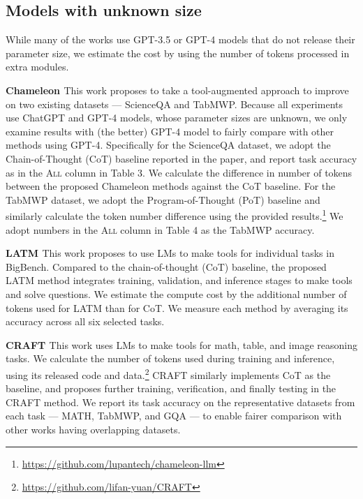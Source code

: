 \subsection{Models with unknown size}

While many of the works use GPT-3.5 or GPT-4 models that do not release their parameter size, we estimate the cost by using the number of tokens processed in extra modules.

\noindent \textbf{Chameleon \citep{lu2023chameleon}} \quad 
This work proposes to take a tool-augmented approach to improve on two existing datasets --- ScienceQA and TabMWP. Because all experiments use ChatGPT and GPT-4 models, whose parameter sizes are unknown, we only examine results with (the better) GPT-4 model to fairly compare with other methods using GPT-4. 
Specifically for the ScienceQA dataset, we adopt the Chain-of-Thought (CoT) baseline reported in the paper, and report task accuracy as in the \textsc{All} column in Table 3. We calculate the difference in number of tokens between the proposed Chameleon methods against the CoT baseline.
For the TabMWP dataset, we adopt the Program-of-Thought (PoT) baseline and similarly calculate the token number difference using the provided results.\footnote{\url{https://github.com/lupantech/chameleon-llm}} We adopt numbers in the \textsc{All} column in Table 4 as the TabMWP accuracy. 


\noindent \textbf{LATM \citep{cai2023large}} \quad
This work proposes to use LMs to make tools for individual tasks in BigBench. Compared to the chain-of-thought (CoT) baseline, the proposed LATM method integrates training, validation, and inference stages to make tools and solve questions. We estimate the compute cost by the additional number of tokens used for LATM than for CoT.
We measure each method by averaging its accuracy across all six selected tasks.

\noindent \textbf{CRAFT \citep{yuan2023craft}} \quad
This work uses LMs to make tools for math, table, and image reasoning tasks. We calculate the number of tokens used during training and inference, using its released code and data.\footnote{\url{https://github.com/lifan-yuan/CRAFT}}
CRAFT similarly implements CoT as the baseline, and proposes further training, verification, and finally testing in the CRAFT method. 
We report its task accuracy on the representative datasets from each task --- MATH, TabMWP, and GQA --- to enable fairer comparison with other works having overlapping datasets.


